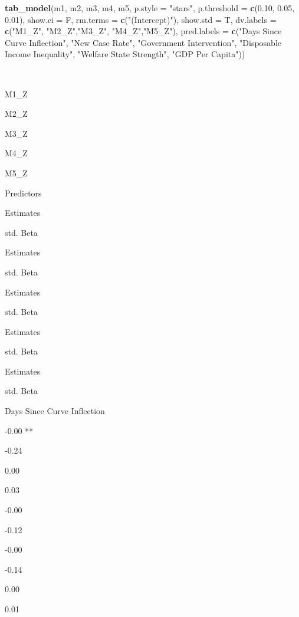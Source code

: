 \documentclass[
]{article}
\newenvironment{Shaded}{\begin{snugshade}}{\end{snugshade}}
\newcommand{\DataTypeTok}[1]{\textcolor[rgb]{0.13,0.29,0.53}{#1}}
\newcommand{\FloatTok}[1]{\textcolor[rgb]{0.00,0.00,0.81}{#1}}
\newcommand{\KeywordTok}[1]{\textcolor[rgb]{0.13,0.29,0.53}{\textbf{#1}}}
\newcommand{\NormalTok}[1]{#1}
\newcommand{\StringTok}[1]{\textcolor[rgb]{0.31,0.60,0.02}{#1}}
\begin{document}
\begin{Shaded}
\begin{Highlighting}[]
\KeywordTok{tab_model}\NormalTok{(m1, m2, m3, m4, m5, }\DataTypeTok{p.style =} \StringTok{"stars"}\NormalTok{, }\DataTypeTok{p.threshold =} \KeywordTok{c}\NormalTok{(}\FloatTok{0.10}\NormalTok{, }\FloatTok{0.05}\NormalTok{, }\FloatTok{0.01}\NormalTok{), }\DataTypeTok{show.ci =}\NormalTok{ F, }\DataTypeTok{rm.terms =} \KeywordTok{c}\NormalTok{(}\StringTok{"(Intercept)"}\NormalTok{), }\DataTypeTok{show.std =}\NormalTok{ T, }\DataTypeTok{dv.labels =} \KeywordTok{c}\NormalTok{(}\StringTok{"M1_Z"}\NormalTok{, }\StringTok{"M2_Z"}\NormalTok{,}\StringTok{"M3_Z"}\NormalTok{, }\StringTok{"M4_Z"}\NormalTok{,}\StringTok{"M5_Z"}\NormalTok{), }\DataTypeTok{pred.labels =} \KeywordTok{c}\NormalTok{(}\StringTok{"Days Since Curve Inflection"}\NormalTok{, }\StringTok{"New Case Rate"}\NormalTok{, }\StringTok{"Government Intervention"}\NormalTok{, }\StringTok{"Disposable Income Inequality"}\NormalTok{, }\StringTok{"Welfare State Strength"}\NormalTok{, }\StringTok{"GDP Per Capita"}\NormalTok{))}
\end{Highlighting}
\end{Shaded}

~

M1\_Z

M2\_Z

M3\_Z

M4\_Z

M5\_Z

Predictors

Estimates

std. Beta

Estimates

std. Beta

Estimates

std. Beta

Estimates

std. Beta

Estimates

std. Beta

Days Since Curve Inflection

-0.00 **

-0.24

0.00

0.03

-0.00

-0.12

-0.00

-0.14

0.00

0.01
\end{document}
